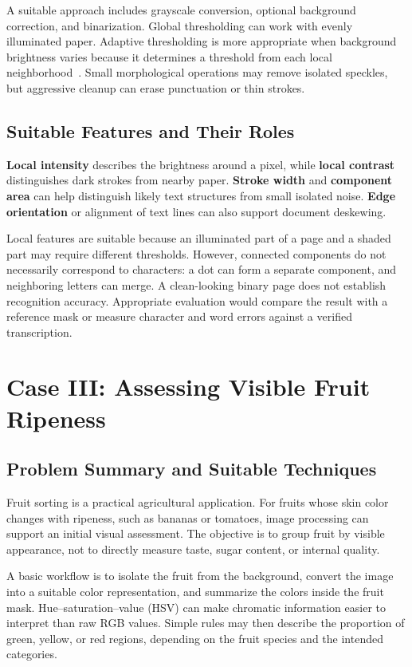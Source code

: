 \documentclass[conference]{IEEEtran}
\begin{document}
A suitable approach includes grayscale conversion, optional background correction, and binarization. Global thresholding can work with evenly illuminated paper. Adaptive thresholding is more appropriate when background brightness varies because it determines a threshold from each local neighborhood~\cite{thresholds}. Small morphological operations may remove isolated speckles, but aggressive cleanup can erase punctuation or thin strokes.

\subsection{Suitable Features and Their Roles}
\textbf{Local intensity} describes the brightness around a pixel, while \textbf{local contrast} distinguishes dark strokes from nearby paper. \textbf{Stroke width} and \textbf{component area} can help distinguish likely text structures from small isolated noise. \textbf{Edge orientation} or alignment of text lines can also support document deskewing.

Local features are suitable because an illuminated part of a page and a shaded part may require different thresholds. However, connected components do not necessarily correspond to characters: a dot can form a separate component, and neighboring letters can merge. A clean-looking binary page does not establish recognition accuracy. Appropriate evaluation would compare the result with a reference mask or measure character and word errors against a verified transcription.

\section{Case III: Assessing Visible Fruit Ripeness}
\subsection{Problem Summary and Suitable Techniques}
Fruit sorting is a practical agricultural application. For fruits whose skin color changes with ripeness, such as bananas or tomatoes, image processing can support an initial visual assessment. The objective is to group fruit by visible appearance, not to directly measure taste, sugar content, or internal quality.

A basic workflow is to isolate the fruit from the background, convert the image into a suitable color representation, and summarize the colors inside the fruit mask. Hue--saturation--value (HSV) can make chromatic information easier to interpret than raw RGB values. Simple rules may then describe the proportion of green, yellow, or red regions, depending on the fruit species and the intended categories.
\end{document}
